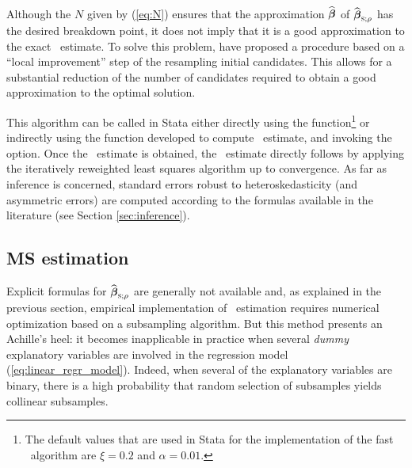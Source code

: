 Although the $N$ given by (\ref{eq:N}) ensures that the approximation
$\widehat{\boldsymbol\beta}$ of $\sthat{\boldsymbol\beta}_{\stsc{S};\rho}$ 
has the desired breakdown point, it does not imply that it is a good
approximation to the exact ~estimate. To solve this problem, 
\citet{salibian:yohai:2006} have proposed a procedure based on a “local
improvement” step of the resampling initial candidates. This
allows for a substantial reduction of the number of candidates required to
obtain a good approximation to the optimal solution.

This algorithm can be called in Stata either directly using the  function\footnote{The default values that are used in Stata for the
implementation of the fast ~algorithm are $\xi = 0.2$ and $\alpha =
0.01$.} or indirectly using the  function developed to compute
~estimate, and invoking the  option. Once the 
~estimate is obtained, the ~estimate directly follows by applying the
iteratively reweighted least squares algorithm up to convergence. As far as
inference is concerned, standard errors robust to heteroskedasticity (and
asymmetric errors) are computed according to the formulas available in the
literature (see Section \ref{sec:inference}).

\subsection{MS estimation}

Explicit formulas for $\sthat{\boldsymbol\beta}_{\stsc{S};\rho}$ are generally
not available and, as explained in the previous section, empirical
implementation of ~estimation requires numerical optimization based on
a subsampling algorithm. But this method presents an Achille's heel: it becomes
inapplicable in practice when several \emph{dummy} explanatory variables are
involved in the regression model (\ref{eq:linear_regr_model}). Indeed, when
several of the explanatory variables are binary, there is a high probability
that random selection of subsamples yields collinear subsamples.

